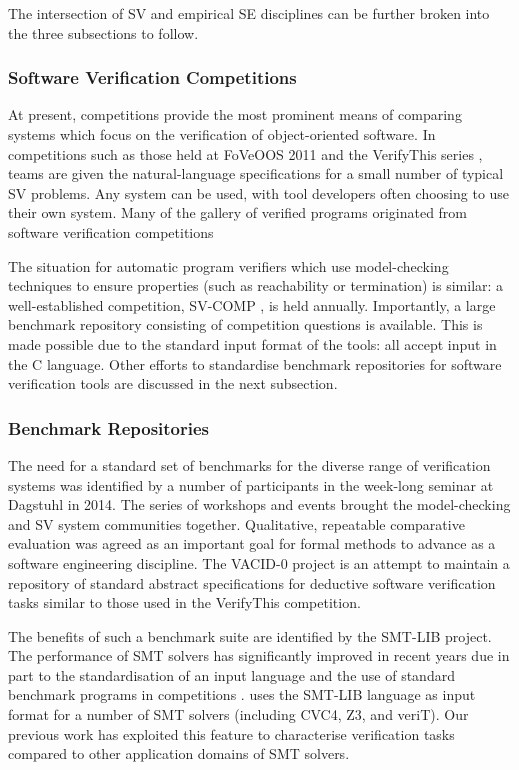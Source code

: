 The intersection of SV and empirical SE disciplines can be further broken into the three subsections to follow.      

\subsubsection{Software Verification Competitions}
\label{sub:lrsvmmbench}

At present, competitions provide the most prominent means of comparing systems which focus on the verification of object-oriented software. In competitions such as those held at FoVeOOS 2011 \cite{bormer:hal-00789525} and the VerifyThis series \cite{Huisman2015}, teams are given the natural-language specifications for a small number of typical SV problems. Any system can be used, with tool developers often choosing to use their own system. Many of the \why gallery of verified programs originated from software verification competitions \cite{verifythis} 

The situation for automatic program verifiers which use model-checking techniques to ensure properties (such as reachability or termination) is similar: a well-established competition, SV-COMP \cite{SVCOMP}, is held annually. Importantly, a large benchmark repository consisting of competition questions is available. This is made possible due to the standard input format of the tools: all accept input in the C language. Other efforts to standardise benchmark repositories for software verification tools are discussed in the next subsection.  

\subsubsection{Benchmark Repositories}

The need for a standard set of benchmarks for the diverse range of verification systems was identified by a number of participants in the week-long seminar at Dagstuhl \cite{Dagstuhl} in 2014. The series of workshops and events brought the model-checking and SV system communities together. Qualitative, repeatable comparative evaluation was agreed as an important goal for formal methods to advance as a software engineering discipline. The VACID-0 \cite{Leino10vacid-0:verification} project is an attempt to maintain a repository of standard abstract specifications for deductive software verification tasks similar to those used in the VerifyThis competition.  

The benefits of such a benchmark suite are identified by the SMT-LIB \cite{SMTLIB} project. The performance of SMT solvers has significantly improved in recent years due in part to the standardisation of an input language and the use of standard benchmark programs in competitions \cite{SMTEVAL2013}. \why uses the SMT-LIB language as input format for a number of SMT solvers (including CVC4, Z3, and veriT). Our previous work \cite{Healy:2016} has exploited this feature to characterise verification tasks  compared to other application domains of SMT solvers.

